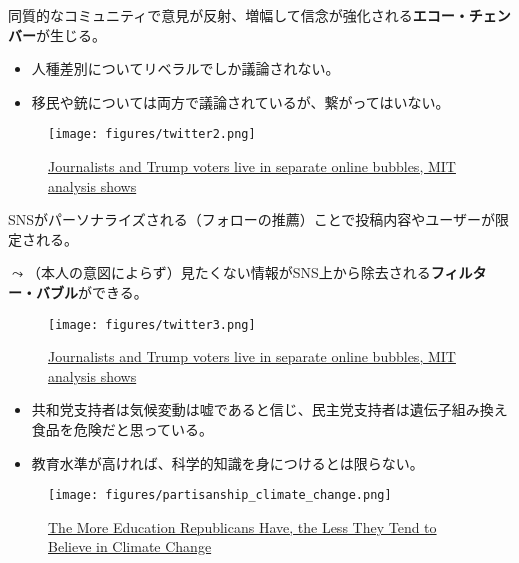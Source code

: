 \documentclass[
  xelatex,
  ja=standard]{bxjsarticle}
\providecommand{\tightlist}{%
  \setlength{\itemsep}{0pt}\setlength{\parskip}{0pt}}\usepackage{longtable,booktabs,array}
\begin{document}
同質的なコミュニティで意見が反射、増幅して信念が強化される\textbf{エコー・チェンバー}が生じる。

\begin{itemize}
\tightlist
\item
  人種差別についてリベラルでしか議論されない。
\item
  移民や銃については両方で議論されているが、繋がってはいない。
\end{itemize}

\begin{figure}[htpb]

{\centering \texttt{[image: figures/twitter2.png]}

}

\caption{\href{https://www.vice.com/en/article/d3xamx/journalists-and-trump-voters-live-in-separate-online-bubbles-mit-analysis-shows}{Journalists
and Trump voters live in separate online bubbles, MIT analysis shows}}

\end{figure}

SNSがパーソナライズされる（フォローの推薦）ことで投稿内容やユーザーが限定される。

\(\leadsto\)（本人の意図によらず）見たくない情報がSNS上から除去される\textbf{フィルター・バブル}ができる。

\begin{figure}[htpb]

{\centering \texttt{[image: figures/twitter3.png]}

}

\caption{\href{https://www.vice.com/en/article/d3xamx/journalists-and-trump-voters-live-in-separate-online-bubbles-mit-analysis-shows}{Journalists
and Trump voters live in separate online bubbles, MIT analysis shows}}

\end{figure}

\begin{itemize}
\tightlist
\item
  共和党支持者は気候変動は嘘であると信じ、民主党支持者は遺伝子組み換え食品を危険だと思っている。
\item
  教育水準が高ければ、科学的知識を身につけるとは限らない。
\end{itemize}

\begin{figure}[htpb]

{\centering \texttt{[image: figures/partisanship\_climate\_change.png]}

}

\caption{\href{https://www.nytimes.com/interactive/2017/11/14/upshot/climate-change-by-education.html}{The
More Education Republicans Have, the Less They Tend to Believe in
Climate Change}}

\end{figure}
\end{document}
